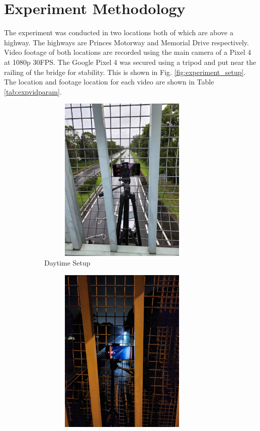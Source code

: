 \documentclass[12pt,a4paper,fleqn]{report}
\begin{document}
\clearpage

\section{Experiment Methodology}
The experiment was conducted in two locations both of which are above a highway.
The highways are Princes Motorway and Memorial Drive respectively.
Video footage of both locations are recorded using the main camera of a Pixel 4 at 1080p 30FPS.
The Google Pixel 4 was secured using a tripod and put near the railing of the bridge for stability.
This is shown in Fig. \ref{fig:experiment_setup}.
The location and footage location for each video are shown in Table \ref{tab:expvidparam}.

\begin{figure}[htbp]
    \centering
    \begin{subfigure}[htbp]{0.48\textwidth}
        \begin{center}
            \includegraphics[width=0.9\textwidth,height=8cm]{figures/experiment_setup.jpg}
        \end{center}
        \caption{Daytime Setup}
        \label{fig:daytime_exp}
    \end{subfigure}
    \begin{subfigure}[htbp]{0.48\textwidth}
        \begin{center}
            \includegraphics[width=0.9\textwidth,height=8cm]{figures/night_time_setup.jpg}

\end{center}
\end{subfigure}
\end{figure}
\end{document}
